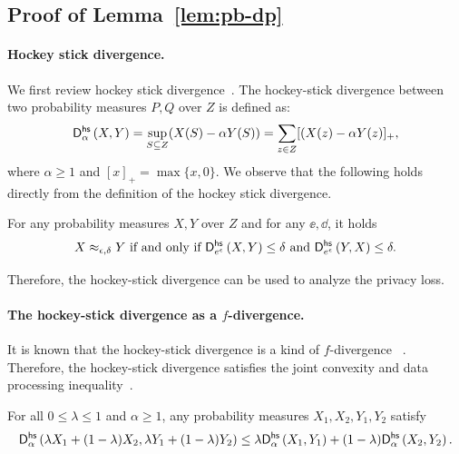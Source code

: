 \subsection{Proof of Lemma~\ref{lem:pb-dp}} \label{apx:proof:pb-dp}
\paragraph{Hockey stick divergence.}
We first review hockey stick divergence~\cite{SasVer15,Ost02,ICALP:BarOlm13}. 
%
% 
The hockey-stick divergence between two probability measures $P,Q$ over $Z$ is defined as:
\begin{equation*}
    \mathsf{D}^\mathsf{hs}_{\alpha}\left({X}, {Y}\right) = \sup_{S \subseteq Z}(X(S) - \alpha Y(S)) = \sum_{z \in Z} [(X(z) - \alpha Y(z)]_+,
\end{equation*}
where $\alpha \geq 1$ and $[x]_+ = \max\{x,0\}$.
We observe that the following holds directly from the definition of the hockey stick divergence.
\begin{corollary}
For any probability measures  $X,Y$ over $Z$ and for any $\ee, \dd$, it holds 
\[ X \approx_{\epsilon,\delta} Y \mbox{ if and only if }  \mathsf{D}^\mathsf{hs}_{e^\epsilon}\left({X}, {Y}\right) \leq \delta \mbox{ and } \mathsf{D}^\mathsf{hs}_{e^\epsilon}\left({Y}, {X}\right) \leq \delta.\]
\end{corollary}

\iffalse
Therefore, the hockey-stick divergence can be used to analyze the privacy loss.
%
\paragraph{The hockey-stick divergence as a $f$-divergence.}
It is known that the hockey-stick divergence is a kind of $f$-divergence
~\cite{ICALP:BarOlm13}.  Therefore, the hockey-stick divergence
satisfies the joint convexity and data processing
inequality~\cite{ICALP:BarOlm13,BBG18}.

\begin{lemma} 
\label{lem:convex}
For all $0 \leq \lambda \leq 1$ and $\alpha\geq 1$, any probability
measures $X_1,X_2,Y_1,Y_2$ satisfy 
%
\begin{equation*}
    \mathsf{D}^\mathsf{hs}_{\alpha}\left({\lambda X_1 + (1-\lambda)X_2}, {\lambda Y_1 +
    (1-\lambda)Y_2}\right) \leq \lambda \mathsf{D}^\mathsf{hs}_{\alpha}\left({X_1}, {Y_1}\right) +
    (1-\lambda)\mathsf{D}^\mathsf{hs}_{\alpha}\left({X_2}, {Y_2}\right).  
\end{equation*}
\end{lemma}

